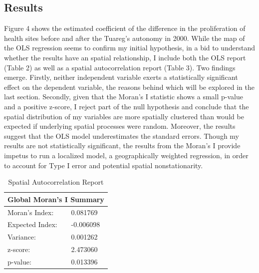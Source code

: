 \documentclass[12pt]{article}
\begin{document}
\subsection{Results}
Figure 4 shows the estimated coefficient of the difference in the proliferation of health sites before and after the Tuareg's autonomy in 2000. While the map of the OLS regression seems to confirm my initial hypothesis, in a bid to understand whether the results have an spatial relationship, I include both the OLS report (Table 2) as well as a spatial autocorrelation report (Table 3). Two findings emerge. Firstly, neither independent variable exerts a statistically significant effect on the dependent variable, the reasons behind which will be explored in the last section. Secondly, given that the Moran's I statistic shows a small p-value and a positive z-score, I reject part of the null hypothesis and conclude that the spatial distribution of my variables are more spatially clustered than would be expected if underlying spatial processes were random. Moreover, the results suggest that the OLS model underestimates the standard errors. Though my results are not statistically significant, the results from the Moran's I provide impetus to run a localized model, a geographically weighted regression, in order to account for Type I error and potential spatial nonstationarity.

\begin{table}
    \small
\begin{center}
\begin{tabular}{|l|l|}
\hline
\multicolumn{2}{|c|}{Global Moran's I Summary}  \\
\hline
Moran's Index:          &           0.081769    \\
Expected Index:         &	        -0.006098   \\ 
Variance:	            &           0.001262    \\
z-score:	            &           2.473060    \\
p-value:     	        &           0.013396    \\  
\hline
\end{tabular}%
\end{center}
\caption{Spatial Autocorrelation Report}
\label{table:coefficients}
\end{table}
\end{document}
